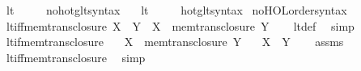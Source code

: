 \begin{isabellebody}
\ lt\ {\isacharparenleft}{\kern0pt}\ {\isachardoublequoteopen}{\isacharless}{\kern0pt}{\isachardoublequoteclose}\ {}{}{\isacharparenright}{\kern0pt}\ \isamarkupfalse%
\isanewline
{}\isamarkupfalse%
\ no{\isacharunderscore}{\kern0pt}hotg{\isacharunderscore}{\kern0pt}lt{\isacharunderscore}{\kern0pt}syntax\ \ \isamarkupfalse%
\ lt\ {\isacharparenleft}{\kern0pt}\ {\isachardoublequoteopen}{\isacharless}{\kern0pt}{\isachardoublequoteclose}\ {}{}{\isacharparenright}{\kern0pt}\ \isamarkupfalse%
\isanewline
{}\isamarkupfalse%
\ hotg{\isacharunderscore}{\kern0pt}lt{\isacharunderscore}{\kern0pt}syntax\isanewline
{}\isamarkupfalse%
\ no{\isacharunderscore}{\kern0pt}HOL{\isacharunderscore}{\kern0pt}order{\isacharunderscore}{\kern0pt}syntax\isanewline
\isanewline
{}\isamarkupfalse%
\ lt{\isacharunderscore}{\kern0pt}iff{\isacharunderscore}{\kern0pt}mem{\isacharunderscore}{\kern0pt}trans{\isacharunderscore}{\kern0pt}closure{\isacharcolon}{\kern0pt}\ {\isachardoublequoteopen}X\ {\isacharless}{\kern0pt}\ Y\ {\isasymlongleftrightarrow}\ X\ {\isasymin}\ mem{\isacharunderscore}{\kern0pt}trans{\isacharunderscore}{\kern0pt}closure\ Y{\isachardoublequoteclose}\isanewline
%
\isadelimproof
\ \ %
\endisadelimproof
%
\isatagproof
{}\isamarkupfalse%
\ lt{\isacharunderscore}{\kern0pt}def\ \isamarkupfalse%
\ simp%
\endisatagproof
{\isafoldproof}%
%
\isadelimproof
\isanewline
%
\endisadelimproof
\isanewline
{}\isamarkupfalse%
\ lt{\isacharunderscore}{\kern0pt}if{\isacharunderscore}{\kern0pt}mem{\isacharunderscore}{\kern0pt}trans{\isacharunderscore}{\kern0pt}closure{\isacharcolon}{\kern0pt}\isanewline
\ \ \ {\isachardoublequoteopen}X\ {\isasymin}\ mem{\isacharunderscore}{\kern0pt}trans{\isacharunderscore}{\kern0pt}closure\ Y{\isachardoublequoteclose}\isanewline
\ \ \ {\isachardoublequoteopen}X\ {\isacharless}{\kern0pt}\ Y{\isachardoublequoteclose}\isanewline
%
\isadelimproof
\ \ %
\endisadelimproof
%
\isatagproof
{}\isamarkupfalse%
\ assms\ \isamarkupfalse%
\ lt{\isacharunderscore}{\kern0pt}iff{\isacharunderscore}{\kern0pt}mem{\isacharunderscore}{\kern0pt}trans{\isacharunderscore}{\kern0pt}closure\ \isamarkupfalse%
\ simp%
\endisatagproof
{\isafoldproof}%
%
\isadelimproof
\isanewline
%
\endisadelimproof

\end{isabellebody}
